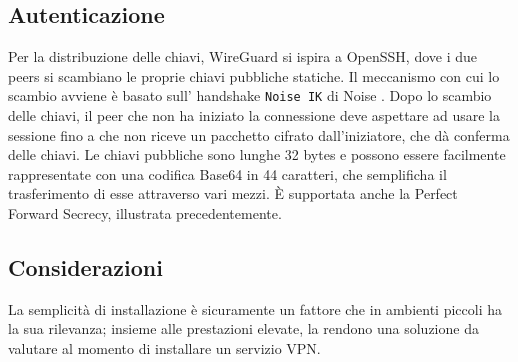 \subsection{Autenticazione}
Per la distribuzione delle chiavi, WireGuard si ispira a OpenSSH, dove i due peers si scambiano le proprie chiavi pubbliche statiche. Il meccanismo con cui lo scambio avviene è basato sull' handshake \texttt{Noise IK} di Noise \cite{Noise}. Dopo lo scambio delle chiavi, il peer che non ha iniziato la connessione deve aspettare ad usare la sessione fino a che non riceve un pacchetto cifrato dall'iniziatore, che dà conferma delle chiavi.
Le chiavi pubbliche sono lunghe 32 bytes e possono essere facilmente rappresentate con una codifica Base64 in 44 caratteri, che semplificha il trasferimento di esse attraverso vari mezzi. È supportata anche la Perfect Forward Secrecy, illustrata precedentemente.

\subsection{Considerazioni}
La semplicità di installazione è sicuramente un fattore che in ambienti piccoli ha la sua rilevanza; insieme alle prestazioni elevate, la rendono una soluzione da valutare al momento di installare un servizio VPN.